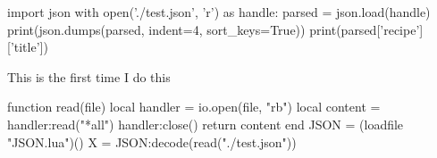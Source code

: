 \begin{pycode} 
    import json
    with open('./test.json', 'r') as handle:
        parsed = json.load(handle)  
    print(json.dumps(parsed, indent=4, sort_keys=True))
    print(parsed['recipe']['title'])
\end{pycode}

This is the first time  I do this

\begin{luacode}
	function read(file)
		local handler = io.open(file, "rb")
		local content = handler:read("*all")
		handler:close()
		return content
	end
	JSON = (loadfile "JSON.lua")()
	X = JSON:decode(read("./test.json"))
\end{luacode}

